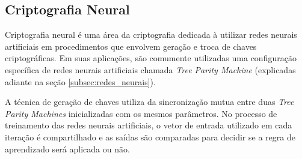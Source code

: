 \documentclass[12pt]{article}
\begin{document}
            
            
        \subsection{Criptografia Neural}
        \label{subsec:criptografia_neural}
        
            Criptografia neural é uma área da criptografia dedicada à utilizar redes neurais artificiais em procedimentos que envolvem geração e troca de chaves criptográficas. Em suas aplicações, são comumente utilizadas uma configuração específica de redes neurais artificiais chamada \textit{Tree Parity Machine} (explicadas adiante na seção \ref{subsec:redes_neurais}).
            
            A técnica de geração de chaves utiliza da sincronização mutua entre duas \textit{Tree Parity Machines} inicializadas com os mesmos parâmetros. No processo de treinamento das redes neurais artificiais, o vetor de entrada utilizado em cada iteração é compartilhado e as saídas são comparadas para decidir se a regra de aprendizado será aplicada ou não.
            
\end{document}
